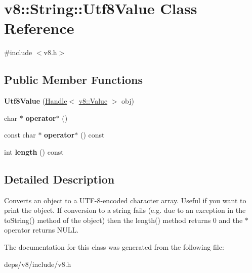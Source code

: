 \hypertarget{classv8_1_1_string_1_1_utf8_value}{}\section{v8\+:\+:String\+:\+:Utf8\+Value Class Reference}
\label{classv8_1_1_string_1_1_utf8_value}


{\ttfamily \#include $<$v8.\+h$>$}

\subsection*{Public Member Functions}
\begin{DoxyCompactItemize}
\item 
\hypertarget{classv8_1_1_string_1_1_utf8_value_aded9fd7ed406e79d5bc40eca15b6b3d7}{}{\bfseries Utf8\+Value} (\hyperlink{classv8_1_1_handle}{Handle}$<$ \hyperlink{classv8_1_1_value}{v8\+::\+Value} $>$ obj)\label{classv8_1_1_string_1_1_utf8_value_aded9fd7ed406e79d5bc40eca15b6b3d7}

\item 
\hypertarget{classv8_1_1_string_1_1_utf8_value_a6cb4914bc426bbe60b0dfdff32213e59}{}char $\ast$ {\bfseries operator$\ast$} ()\label{classv8_1_1_string_1_1_utf8_value_a6cb4914bc426bbe60b0dfdff32213e59}

\item 
\hypertarget{classv8_1_1_string_1_1_utf8_value_a6557ad0916c472faebd8bfdc3da5c4f7}{}const char $\ast$ {\bfseries operator$\ast$} () const \label{classv8_1_1_string_1_1_utf8_value_a6557ad0916c472faebd8bfdc3da5c4f7}

\item 
\hypertarget{classv8_1_1_string_1_1_utf8_value_a1e2572abf6adc0786769482df9906f19}{}int {\bfseries length} () const \label{classv8_1_1_string_1_1_utf8_value_a1e2572abf6adc0786769482df9906f19}

\end{DoxyCompactItemize}


\subsection{Detailed Description}
Converts an object to a U\+T\+F-\/8-\/encoded character array. Useful if you want to print the object. If conversion to a string fails (e.\+g. due to an exception in the to\+String() method of the object) then the length() method returns 0 and the $\ast$ operator returns N\+U\+L\+L. 

The documentation for this class was generated from the following file\+:\begin{DoxyCompactItemize}
\item 
deps/v8/include/v8.\+h\end{DoxyCompactItemize}
